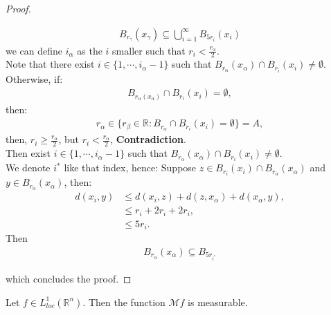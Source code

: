 \begin{proof}
\begin{enumerate}
\begin{enumerate}
\begin{align*}
            B_{r_{\gamma}}(x_{\gamma})\subseteq \bigcup_{i=1}^{\infty}B_{5r_i}(x_i)  
          \end{align*}
          we can define $i_{\alpha}$ as the $i$ smaller such that $r_i<\frac{r_\alpha}{2}$.\\
          Note that there exist $i\in\{1,\cdots,i_{\alpha}-1\}$ such that $B_{r_{\alpha}}(x_\alpha)\cap B_{r_i}(x_i)\neq \emptyset$.\\
          Otherwise, if:
          \begin{align*}
            B_{r_{\alpha}(x_{\alpha})}\cap B_{r_i}(x_i)=\emptyset,
          \end{align*}
          then:
          \begin{align*}
            r_{\alpha}\in\{r_{\beta}\in\mathbb{R}: B_{r_{\alpha}}\cap B_{r_i}(x_i)=\emptyset\}=A,
          \end{align*}
          then, $r_{i}\geq \frac{r_{\alpha}}{2}$, but $r_{i}<\frac{r_{\alpha}}{2}$, \textbf{Contradiction}.\\
          Then exist $i\in\{1,\cdots,i_{\alpha}-1\}$ such that $B_{r_{\alpha}}(x_\alpha)\cap B_{r_i}(x_i)\neq \emptyset$.\\
          We denote $i^{*}$ like that index, hence:
          Suppose $z\in B_{r_i}(x_i)\cap B_{r_{\alpha}}(x_{\alpha})$ and $y\in B_{r_{\alpha}}(x_{\alpha})$, then: 
          \begin{align*}
            d(x_i,y)&\leq d(x_i,z) + d(z,x_{\alpha}) + d(x_{\alpha},y),\\
            &\leq r_i+2r_i+2r_i,\\
            &\leq 5r_i.
          \end{align*}
          Then
          \begin{align*}
            B_{r_{\alpha}}(x_{\alpha})\subseteq B_{5r_{i^{*}}}
          \end{align*}
      \end{enumerate}
  \end{enumerate}
  which concludes the proof.
\end{proof}

\begin{lemma}{}
  Let $f\in L^1_{loc}(\mathbb{R}^{n})$. Then the function $\mathcal{M}f$ is measurable. 
\end{lemma}

